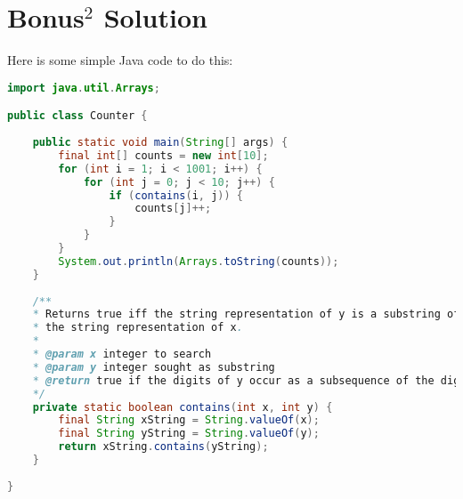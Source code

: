 \documentclass[11pt,a4paper]{report}
\theoremstyle{plain}
\theoremstyle{definition}
\theoremstyle{remark}
\begin{document}
\section*{Bonus$^2$ Solution}
Here is some simple Java code to do this:
\newpage
\begin{lstlisting}[language=Java]
import java.util.Arrays;

public class Counter {
	
	public static void main(String[] args) {
		final int[] counts = new int[10];
		for (int i = 1; i < 1001; i++) {
			for (int j = 0; j < 10; j++) {
				if (contains(i, j)) {
					counts[j]++;
				}
			}
		}
		System.out.println(Arrays.toString(counts));
	}
	
	/**
	* Returns true iff the string representation of y is a substring of
	* the string representation of x.
	*
	* @param x integer to search
	* @param y integer sought as substring
	* @return true if the digits of y occur as a subsequence of the digits of x
	*/
	private static boolean contains(int x, int y) {
		final String xString = String.valueOf(x);
		final String yString = String.valueOf(y);
		return xString.contains(yString);
	}
	
}

\end{lstlisting}

 
\end{document}
